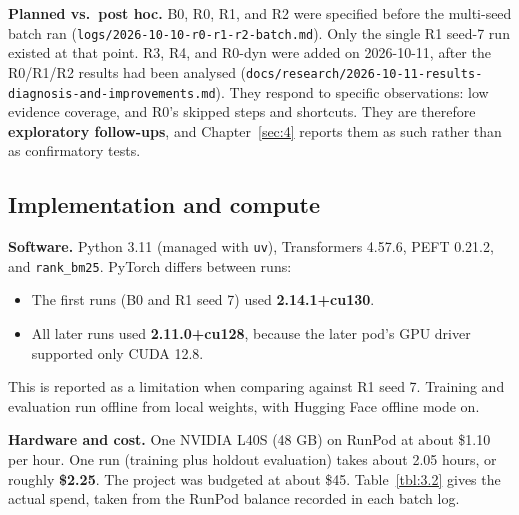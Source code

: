 \textbf{Planned vs.~post hoc.} B0, R0, R1, and R2 were specified before
the multi-seed batch ran
(\texttt{logs/\allowbreak{}2026-\allowbreak{}10-\allowbreak{}10-\allowbreak{}r0-\allowbreak{}r1-\allowbreak{}r2-\allowbreak{}batch.\allowbreak{}md}).
Only the single R1 seed-7 run existed at that point. R3, R4, and R0-dyn
were added on 2026-10-11, after the R0/R1/R2 results had been analysed
(\texttt{docs/\allowbreak{}research/\allowbreak{}2026-\allowbreak{}10-\allowbreak{}11-\allowbreak{}results-\allowbreak{}diagnosis-\allowbreak{}and-\allowbreak{}improvements.\allowbreak{}md}).
They respond to specific observations: low evidence coverage, and R0's
skipped steps and shortcuts. They are therefore \textbf{exploratory
follow-ups}, and Chapter~\ref{sec:4} reports them as such rather than as
confirmatory tests.

\subsection{Implementation and compute}\label{sec:3.9}

\textbf{Software.} Python 3.11 (managed with \texttt{uv}), Transformers
4.57.6, PEFT 0.21.2, and \texttt{rank\_\allowbreak{}bm25}. PyTorch
differs between runs:

\begin{itemize}
\tightlist
\item
  The first runs (B0 and R1 seed 7) used \textbf{2.14.1+cu130}.
\item
  All later runs used \textbf{2.11.0+cu128}, because the later pod's GPU
  driver supported only CUDA 12.8.
\end{itemize}

This is reported as a limitation when comparing against R1 seed 7.
Training and evaluation run offline from local weights, with Hugging
Face offline mode on.

\textbf{Hardware and cost.} One NVIDIA L40S (48 GB) on RunPod at about
\$1.10 per hour. One run (training plus holdout evaluation) takes about
2.05 hours, or roughly \textbf{\$2.25}. The project was budgeted at
about \$45. Table~\ref{tbl:3.2} gives the actual spend, taken from the
RunPod balance recorded in each batch log.


